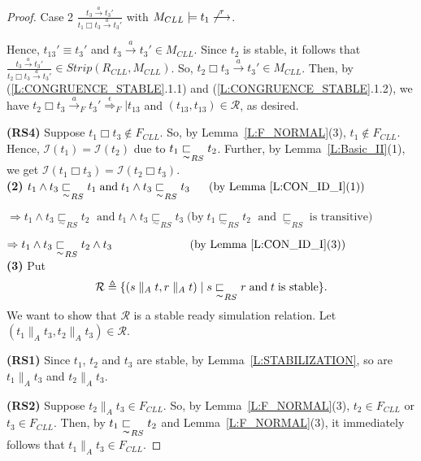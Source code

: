 \documentclass{elsarticle}
\theoremstyle{plain}
\theoremstyle{definition}
\begin{document}
\begin{proof}
\noindent  Case 2 $\frac{t_3 \stackrel{a}{\longrightarrow} t_3'}{t_1 \Box t_3 \stackrel{a}{\longrightarrow} t_3'}$ with $M_{{CLL}} \models t_1 \not\stackrel{\tau}{\longrightarrow}$.

    Hence, $t_{13}' \equiv t_3'$ and $t_3 \stackrel{a}{\longrightarrow} t_3' \in M_{{CLL}}$.
   Since $t_2$ is stable, it follows that $\frac{t_3 \stackrel{a}{\longrightarrow} t_3'}{t_2 \Box t_3 \stackrel{a}{\longrightarrow}t_3'} \in Strip(R_{CLL},M_{{CLL}})$.
   So, $t_2 \Box t_3 \stackrel{a}{\longrightarrow} t_3' \in M_{{CLL}} $.
   Then, by (\ref{L:CONGRUENCE_STABLE}.1.1) and  (\ref{L:CONGRUENCE_STABLE}.1.2), we have $t_2 \Box t_3 \stackrel{a}{\longrightarrow}_F t_3' \stackrel{\epsilon}{\Longrightarrow}_F|t_{13}$ and $(t_{13},t_{13}) \in {\mathcal R}$,  as desired.

\textbf{(RS4)} Suppose $t_1 \Box t_3 \notin F_{{CLL}}$.
 So, by Lemma~\ref{L:F_NORMAL}(3), $t_1 \notin F_{{CLL}}$.
 Hence, ${\mathcal I}(t_1)={\mathcal I}(t_2) $ due to $t_1 \underset{\thicksim}{\sqsubset}_{RS} t_2$.
Further, by Lemma~\ref{L:Basic_II}(1), we get ${\mathcal I}(t_1 \Box t_3)={\mathcal I}(t_2 \Box t_3) $.\\

\noindent \textbf{(2)}
    $  t_1 \wedge t_3 \underset{\sim}{\sqsubset}_{RS} t_1 \;\text{and}\; t_1 \wedge t_3 \underset{\sim}{\sqsubset}_{RS} t_3 \; \;\;\;\;\;  \text{(by Lemma~\ref{L:CON_ID_I}(1))} $

    $  \Rightarrow t_1 \wedge t_3 \underset{\sim}{\sqsubset}_{RS} t_2\;\text{ and}\;  t_1 \wedge t_3 \underset{\sim}{\sqsubset}_{RS} t_3\;  \text{(by}\; t_1 \underset{\sim}{\sqsubset}_{RS} t_2\;\text{ and}\; \underset{\sim}{\sqsubset}_{RS}\;\text{is transitive)} $

    $  \Rightarrow t_1 \wedge t_3 \underset{\sim}{\sqsubset}_{RS} t_2 \wedge t_3\;  \qquad \qquad \qquad\;\; \text{(by Lemma~\ref{L:CON_ID_I}(3))} $\\

\noindent \textbf{(3)}
        Put \[{\mathcal R}\triangleq \{(s \parallel_A t, r \parallel_A t)\;|\; s \underset{\thicksim}{\sqsubset}_{RS} r\;\text{and}\;t\;\text{is stable}\}.\]
We want to show that $\mathcal R$ is a stable ready simulation relation. Let $(t_1 \parallel_A t_3, t_2\parallel_A t_3) \in {\mathcal R}$.

\textbf{(RS1)} Since $t_1$, $t_2$ and $t_3$ are stable, by Lemma~\ref{L:STABILIZATION}, so are $t_1 \parallel_A t_3$ and $t_2\parallel_A t_3$.

\textbf{(RS2)} Suppose $ t_2\parallel_A t_3  \in F_{{CLL}}$.
    So, by Lemma~\ref{L:F_NORMAL}(3), $t_2 \in F_{{CLL}}$ or $t_3\in F_{{CLL}}$.
    Then, by  $t_1 \underset{\thicksim}{\sqsubset}_{RS} t_2$ and Lemma~\ref{L:F_NORMAL}(3), it immediately follows that $t_1 \parallel_A t_3  \in F_{{CLL}}$.


\end{proof}
\end{document}
